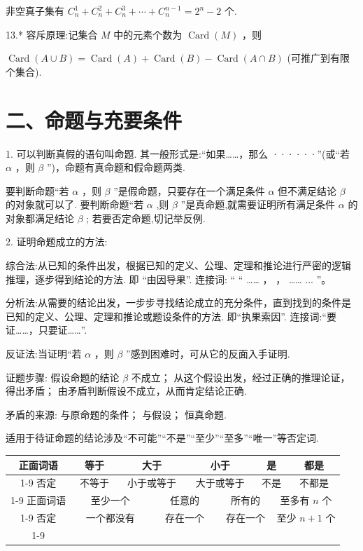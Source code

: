 非空真子集有 ${{C}}_{n}^{1} + {{C}}_{n}^{2} + {{C}}_{n}^{3} + \cdots  + {{C}}_{n}^{n - 1} = {2}^{n} - 2$ 个.

13.* 容斥原理:记集合 $M$ 中的元素个数为 $\operatorname{Card}\left( M\right)$ ，则

$\operatorname{Card}\left( {A \cup  B}\right)  = \operatorname{Card}\left( A\right)  + \operatorname{Card}\left( B\right)  - \operatorname{Card}\left( {A \cap  B}\right)$ (可推广到有限个集合).

\section*{二、命题与充要条件}

1. 可以判断真假的语句叫命题. 其一般形式是:“如果……，那么 ······”(或“若 $\alpha$ ，则 $\beta$ ”)，命题有真命题和假命题两类.

要判断命题“若 $\alpha$ ，则 $\beta$ ”是假命题，只要存在一个满足条件 $\alpha$ 但不满足结论 $\beta$ 的对象就可以了. 要判断命题“若 $\alpha$ ,则 $\beta$ ”是真命题,就需要证明所有满足条件 $\alpha$ 的对象都满足结论 $\beta$ ; 若要否定命题,切记举反例.

2. 证明命题成立的方法:

综合法:从已知的条件出发，根据已知的定义、公理、定理和推论进行严密的逻辑推理，逐步得到结论的方法. 即 “由因导果”. 连接词: “ “ …… ， ， …… ... ”。

分析法:从需要的结论出发，一步步寻找结论成立的充分条件，直到找到的条件是已知的定义、公理、定理和推论或题设条件的方法. 即“执果索因”. 连接词:“要证……，只要证……”.

反证法:当证明“若 $\alpha$ ，则 $\beta$ ”感到困难时，可从它的反面入手证明.

证题步骤:  假设命题的结论 $\beta$ 不成立；  从这个假设出发，经过正确的推理论证，得出矛盾；  由矛盾判断假设不成立，从而肯定结论正确.

矛盾的来源:   与原命题的条件；   与假设；   恒真命题.

适用于待证命题的结论涉及“不可能”“不是”“至少”“至多”“唯一”等否定词.

\begin{center}
\begin{tabular}{|c|c|c|c|c|c|c|c|c|}
\hline
正面词语 & 等于 & \multicolumn{2}{|c|}{大于} & \multicolumn{2}{|c|}{小于} & \multicolumn{2}{|c|}{是} & 都是 \\
\cline{1-9}
否定 & 不等于 & \multicolumn{2}{|c|}{小于或等于} & \multicolumn{2}{|c|}{大于或等于} & \multicolumn{2}{|c|}{不是} & 不都是 \\
\cline{1-9}
正面词语 & \multicolumn{2}{|c|}{至少一个} & \multicolumn{2}{|c|}{任意的} & \multicolumn{2}{|c|}{所有的} & \multicolumn{2}{|c|}{至多有 $n$ 个} \\
\cline{1-9}
否定 & \multicolumn{2}{|c|}{一个都没有} & \multicolumn{2}{|c|}{存在一个} & \multicolumn{2}{|c|}{存在一个} & \multicolumn{2}{|c|}{至少 $n + 1$ 个} \\
\cline{1-9}
\hline
\end{tabular}
\end{center}


